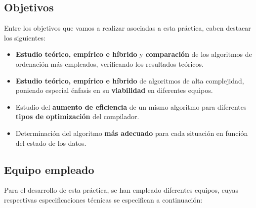 \documentclass{homework}
\begin{document}
    \subsection{Objetivos} 

    Entre los objetivos que vamos a realizar asociadas a esta práctica, caben destacar los siguientes: 

    \begin{itemize}
        \item \textbf{Estudio teórico, empírico e híbrido} y \textbf{comparación} de los algoritmos de ordenación más empleados, verificando los resultados teóricos.
        \item \textbf{Estudio teórico, empírico e híbrido} de algoritmos de alta complejidad, poniendo especial énfasis en su \textbf{viabilidad} en diferentes equipos. 
        \item Estudio del \textbf{aumento de eficiencia} de un mismo algoritmo para diferentes \textbf{tipos de optimización} del compilador. 
        \item Determinación del algoritmo \textbf{más adecuado} para cada situación en función del estado de los datos.
    \end{itemize}

    \subsection{Equipo empleado}

    Para el desarrollo de esta práctica, se han empleado diferentes equipos, cuyas respectivas especificaciones técnicas se 
    especifican a continuación:
    
\end{document}
